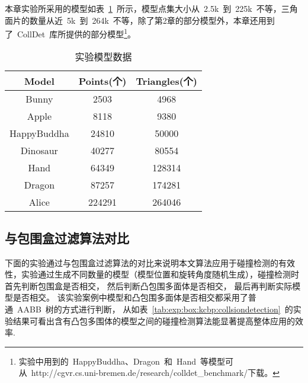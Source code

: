 本章实验所采用的模型如表~\ref{tab:exp:models}~所示，模型点集大小从~2.5k~到~225k~不等，三角面片的数量从近~5k~到~264k~不等，除了第2章的部分模型外，本章还用到了~CollDet~库所提供的部分模型\footnote{实验中用到的~HappyBuddha、Dragon~和~Hand~等模型可从~http://cgvr.cs.uni-bremen.de/research/colldet\_benchmark/下载。}。

\begin{table}[htbp]  
\centering
\caption{实验模型数据}
\label{tab:exp:models}
\begin{tabular}{ccc}
\toprule[1.5pt]
Model   &   Points(个)	&   Triangles(个) \\
\midrule[1.0pt]
Bunny	&2503	&4968 \\
Apple	&8118	&9380 \\
HappyBuddha	&24810	&50000 \\
Dinosaur	&40277	&80554 \\
Hand	&64349	&128314\\
Dragon	&87257	&174281\\
Alice 	&224291	&264046\\
\bottomrule[1.5pt]
\end{tabular}
\end{table}


\subsection{与包围盒过滤算法对比}
\label{subsec:exper:box:kcbp}

下面的实验通过与包围盒过滤算法的对比来说明本文算法应用于碰撞检测的有效性，实验通过生成不同数量的模型（模型位置和旋转角度随机生成），碰撞检测时首先判断包围盒是否相交， 然后判断凸包围多面体是否相交， 最后再判断实际模型是否相交。
该实验案例中模型和凸包围多面体是否相交都采用了普通~AABB~树的方式进行判断，
从如表~\ref{tab:exp:box:kcbp:collsiondetection}~的实验结果可看出含有凸包多围体的模型之间的碰撞检测算法能显著提高整体应用的效率. 

